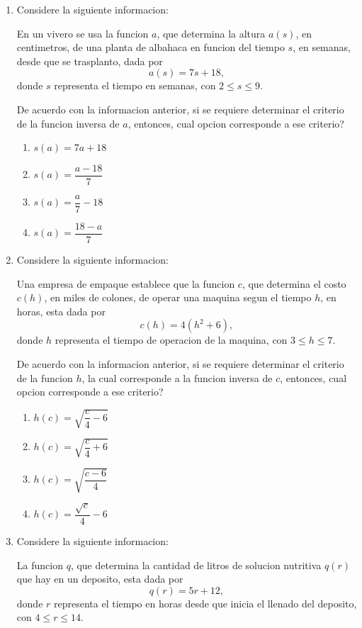 \documentclass[12pt]{article}
\begin{document}
\begin{enumerate}[label=\textbf{\arabic*.}, itemsep=1.05cm]
\Needspace{0.56\textheight}
\item
Considere la siguiente informacion:

En un vivero se usa la funcion $a$, que determina la altura $a(s)$, en centimetros, de una planta de albahaca en funcion del tiempo $s$, en semanas, desde que se trasplanto, dada por
\[
a(s)=7s+18,
\]
donde $s$ representa el tiempo en semanas, con $2 \leq s \leq 9$.

De acuerdo con la informacion anterior, si se requiere determinar el criterio de la funcion inversa de $a$, entonces, \textquestiondown cual opcion corresponde a ese criterio?

\begin{enumerate}[label=\Alph*)]
  \item $s(a)=7a+18$
  \item $s(a)=\dfrac{a-18}{7}$
  \item $s(a)=\dfrac{a}{7}-18$
  \item $s(a)=\dfrac{18-a}{7}$
\end{enumerate}

\Needspace{0.62\textheight}
\item
Considere la siguiente informacion:

Una empresa de empaque establece que la funcion $c$, que determina el costo $c(h)$, en miles de colones, de operar una maquina segun el tiempo $h$, en horas, esta dada por
\[
c(h)=4(h^2+6),
\]
donde $h$ representa el tiempo de operacion de la maquina, con $3 \leq h \leq 7$.

De acuerdo con la informacion anterior, si se requiere determinar el criterio de la funcion $h$, la cual corresponde a la funcion inversa de $c$, entonces, \textquestiondown cual opcion corresponde a ese criterio?

\begin{enumerate}[label=\Alph*)]
  \item $h(c)=\sqrt{\dfrac{c}{4}-6}$
  \item $h(c)=\sqrt{\dfrac{c}{4}+6}$
  \item $h(c)=\sqrt{\dfrac{c-6}{4}}$
  \item $h(c)=\dfrac{\sqrt{c}}{4}-6$
\end{enumerate}

\Needspace{0.56\textheight}
\item
Considere la siguiente informacion:

La funcion $q$, que determina la cantidad de litros de solucion nutritiva $q(r)$ que hay en un deposito, esta dada por
\[
q(r)=5r+12,
\]
donde $r$ representa el tiempo en horas desde que inicia el llenado del deposito, con $4 \leq r \leq 14$.


\end{enumerate}
\end{document}
